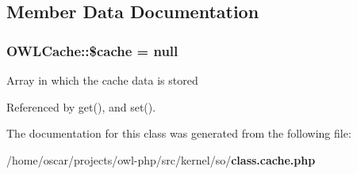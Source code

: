 \subsection{Member Data Documentation}
\subsubsection[{\$cache}]{\setlength{\rightskip}{0pt plus 5cm}OWLCache::\$cache = null\hspace{0.3cm}{\ttfamily  [static, private]}}\label{classOWLCache_a429167796c668f4edde177d017f9f86c}
Array in which the cache data is stored 

Referenced by get(), and set().



The documentation for this class was generated from the following file:\begin{DoxyCompactItemize}
\item 
/home/oscar/projects/owl-\/php/src/kernel/so/{\bf class.cache.php}\end{DoxyCompactItemize}
